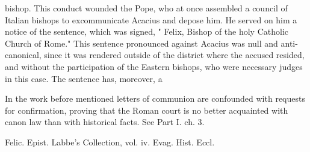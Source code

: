 bishop. This conduct wounded the Pope, who at once assembled a council of Italian bishops to excommunicate Acacius and depose him. He served on him a notice of the sentence, which was signed, " Felix, Bishop of the holy Catholic Church of Rome." This sentence pronounced against Acacius was null and anti-canonical, since it was rendered outside of the district where the accused resided, and without the participation of the Eastern bishops, who were necessary judges in this case. The sentence has, moreover, a

In the work before mentioned letters of communion are confounded with requests for confirmation, proving that the Roman court is no better acquainted with canon law than with historical facts. See Part I. ch. 3.

Felic. Epist. Labbe’s Collection, vol. iv. Evag. Hist. Eccl.

